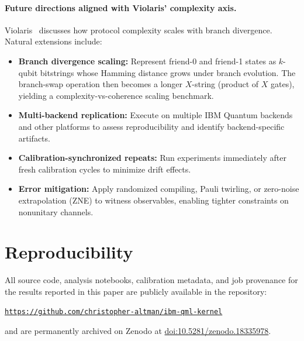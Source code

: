 \documentclass[11pt]{article}
\begin{document}
\paragraph{Future directions aligned with Violaris' complexity axis.}
Violaris~\cite{violaris2026interbranch} discusses how protocol complexity scales with branch divergence. Natural extensions include:
\begin{itemize}
    \item \textbf{Branch divergence scaling:} Represent friend-0 and friend-1 states as $k$-qubit bitstrings whose Hamming distance grows under branch evolution. The branch-swap operation then becomes a longer $X$-string (product of $X$ gates), yielding a complexity-vs-coherence scaling benchmark.
    \item \textbf{Multi-backend replication:} Execute on multiple IBM Quantum backends and other platforms to assess reproducibility and identify backend-specific artifacts.
    \item \textbf{Calibration-synchronized repeats:} Run experiments immediately after fresh calibration cycles to minimize drift effects.
    \item \textbf{Error mitigation:} Apply randomized compiling, Pauli twirling, or zero-noise extrapolation (ZNE) to witness observables, enabling tighter constraints on nonunitary channels.
\end{itemize}

\section{Reproducibility}
\label{sec:reproducibility}

All source code, analysis notebooks, calibration metadata, and job provenance for the results reported in this paper are publicly available in the repository:
  \vspace*{10pt}%
  
  \hspace*{30pt}%
  \href{https://github.com/christopher-altman/ibm-qml-kernel}{\nolinkurl{https://github.com/christopher-altman/ibm-qml-kernel}}
  \vspace*{10pt}%
  
  and are permanently archived on Zenodo at
\href{https://doi.org/10.5281/zenodo.18335978}{doi:10.5281/zenodo.18335978}.
  \vspace*{10pt}%
  
\end{document}

